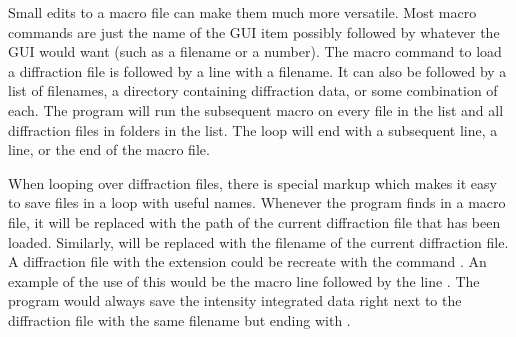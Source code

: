 Small edits to a macro file can make them much more versatile. 
Most macro commands are just the name of the GUI item
possibly followed by whatever the GUI would want (such as a 
filename or a number). The macro command to load a diffraction 
file is  followed by a line with 
a filename. It can also be followed by a list of filenames,
a directory containing diffraction data, or some combination
of each. The program will run the subsequent macro on
every file in the list and all diffraction files 
in folders in the list. The loop will end with a subsequent 
 line, a  line, or 
the end of the macro file.

When looping over diffraction files, there is special 
markup which makes it easy to save files in a loop with 
useful names. Whenever the
program finds  in a macro file,
it will be replaced with the path of the current
diffraction file that has been loaded. Similarly, 
 will be replaced with the filename of
the current diffraction file. A
diffraction file with the extension  could be 
recreate with the command .
An example of the use of this would be the macro line 
 followed by the line
. The program would always
save the intensity integrated data right next to the diffraction 
file with the same filename but ending with .
